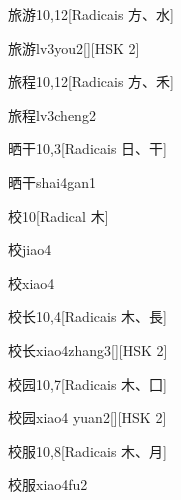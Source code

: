 \begin{entry}{旅游}{10,12}[Radicais ⽅、⽔]
  \begin{phonetics}{旅游}{lv3you2}[][HSK 2]
  \end{phonetics}
\end{entry}

\begin{entry}{旅程}{10,12}[Radicais ⽅、⽲]
  \begin{phonetics}{旅程}{lv3cheng2}
  \end{phonetics}
\end{entry}

\begin{entry}{晒干}{10,3}[Radicais ⽇、⼲]
  \begin{phonetics}{晒干}{shai4gan1}
  \end{phonetics}
\end{entry}

\begin{entry}{校}{10}[Radical ⽊]
  \begin{phonetics}{校}{jiao4}
  \end{phonetics}
  \begin{phonetics}{校}{xiao4}
  \end{phonetics}
\end{entry}

\begin{entry}{校长}{10,4}[Radicais ⽊、⾧]
  \begin{phonetics}{校长}{xiao4zhang3}[][HSK 2]
  \end{phonetics}
\end{entry}

\begin{entry}{校园}{10,7}[Radicais ⽊、⼞]
  \begin{phonetics}{校园}{xiao4 yuan2}[][HSK 2]
  \end{phonetics}
\end{entry}

\begin{entry}{校服}{10,8}[Radicais ⽊、⽉]
  \begin{phonetics}{校服}{xiao4fu2}
  \end{phonetics}
\end{entry}

